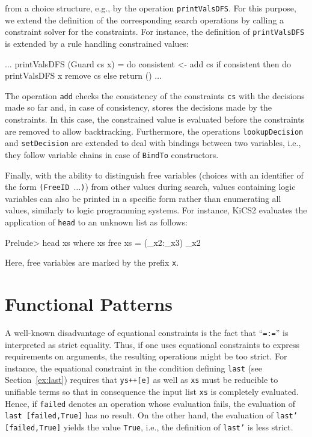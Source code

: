 \documentclass{llncs}
\newcommand{\code}[1]{\mbox{\small\texttt{#1}}}
\newcommand{\ccode}[1]{``\code{#1}''}
\newcommand{\us}{\char95\xspace} %
\begin{document}
from a choice structure, e.g., by the operation \code{printValsDFS}.
For this purpose, we extend the definition of the corresponding search
operations by calling a constraint solver for the constraints.
For instance, the definition of \code{printValsDFS} is extended by
a rule handling constrained values:
%
\begin{haskell}
  $\ldots$
  printValsDFS (Guard cs x) = do consistent <- add cs
                                 if consistent then do printValsDFS x
                                                       remove cs
                                               else return ()
  $\ldots$
\end{haskell}
The operation \code{add} checks the consistency of the constraints \code{cs}
with the decisions made so far and, in case of consistency,
stores the decisions made by the constraints.
In this case, the constrained value is evaluated
before the constraints are removed to allow backtracking.
Furthermore, the operations \code{lookupDecision} and \code{setDecision}
are extended to deal with bindings between two variables,
i.e., they follow variable chains in case of \code{BindTo} constructors.

Finally, with the ability to distinguish free variables 
(choices with an identifier of the form \code{(FreeID $\ldots$)})
from other values during search, values containing logic variables 
can also be printed in a specific form rather than enumerating all values, 
similarly to logic programming systems. For instance, KiCS2 evaluates the 
application of \code{head} to an unknown list as follows:
\begin{haskell}
  Prelude> head xs where xs free
  {xs = (_x2:_x3)} _x2
\end{haskell}
Here, free variables are marked by the prefix \code{\us{}x}.



\section{Functional Patterns}
\label{sec:FuncPatterns}

A well-known disadvantage of equational constraints
is the fact that \ccode{=:=} is interpreted as strict equality.
Thus, if one uses equational constraints to express
requirements on arguments, the resulting operations might be too strict.
For instance, the equational constraint in the condition
defining \code{last} (see Section~\ref{ex:last})
requires that \code{ys++[e]} as well as \code{xs}
must be reducible to unifiable terms so that in consequence
the input list \code{xs} is completely evaluated.
Hence, if \code{failed} denotes an operation whose evaluation fails,
the evaluation of \code{last [failed,True]} has no result.
On the other hand, the evaluation of \code{last' [failed,True]} yields
the value \code{True}, i.e., the definition of \code{last'} is less strict.
\end{document}
